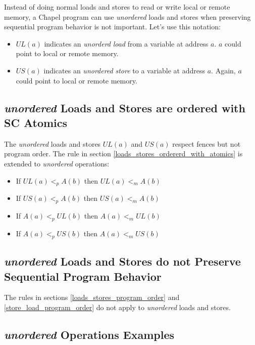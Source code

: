 Instead of doing normal loads and stores to read or write local or remote
memory, a Chapel program can use \textit{unordered} loads and stores when
preserving sequential program behavior is not important. Let's use this
notation:

\begin{itemize}

  \item $UL(a)$ indicates an \textit{unorderd} \textit{load} from a
  variable at address $a$. $a$ could point to local or remote memory.

  \item $US(a)$ indicates an \textit{unordered} \textit{store} to a
  variable at address $a$. Again, $a$ could point to local or remote
  memory.

\end{itemize}

\subsection{\textit{unordered} Loads and Stores are ordered with SC Atomics}

The \textit{unordered} loads and stores $UL(a)$ and $US(a)$ respect fences
but not program order. The rule in section
\ref{loads_stores_ordererd_with_atomics} is extended to \textit{unordered}
operations:

\begin{itemize}
  \item If $UL(a)<_pA(b)$ then $UL(a)<_mA(b)$
  \item If $US(a)<_pA(b)$ then $US(a)<_mA(b)$
  \item If $A(a)<_pUL(b)$ then $A(a)<_mUL(b)$
  \item If $A(a)<_pUS(b)$ then $A(a)<_mUS(b)$
\end{itemize}

\subsection{\textit{unordered} Loads and Stores do not Preserve Sequential
Program Behavior}

The rules in sections \ref{loads_stores_program_order} and
\ref{store_load_program_order} do not apply to \textit{unordered} loads
and stores.

\subsection{\textit{unordered} Operations Examples}

